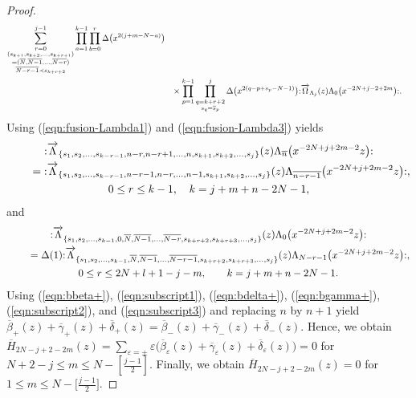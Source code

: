 \documentclass[pdftex]{sigma}
\numberwithin{equation}{section}
\begin{document}
\begin{proof}
\begin{align}
\sum\limits_{\substack{r=0\\(s_{k+1},s_{k+2},\dots, s_{k+r+1})\\
=(\overline{N}, \overline{N-1},\dots, \overline{N-r})
\\ \overline{N-r-1}\prec s_{k+r+2}}}^{j-1}
\prod_{a=1}^{k-1}\prod_{b=0}^r \Delta\big(x^{2(j+m-N-a)}\big)\notag
\\
&\phantom{+}\times\prod_{p=1}^{k-1}\prod\limits_{\substack{q=k+r+2\\s_q=\overline{s}_p}}^j
\Delta\big(x^{2(q-p+s_p-N-1)}\big){:}
\overrightarrow{\Omega}_{\Lambda_j}(z)\Lambda_0\big(x^{-2N+j-2+2m}\big){:}.
\label{eqn:bgamma+}
\end{align}
Using (\ref{eqn:fusion-Lambda1}) and (\ref{eqn:fusion-Lambda3}) yields
\begin{gather}
{:}\overrightarrow{\Lambda}_{\{
s_1,s_2, \dots, s_{k-r-1}, n-r, n-r+1,\dots, n, s_{k+1}, s_{k+2}, \dots, s_{j}
\}}(z) \Lambda_{\overline{n}}\big(x^{-2N+j+2m-2}z\big){:}\notag
\\ \qquad
{}={:}\overrightarrow{\Lambda}_{\{
s_1,s_2, \dots, s_{k-r-1}, n-r-1, n-r,\dots, n-1, s_{k+1}, s_{k+2}, \dots, s_{j}
\}}(z) \Lambda_{\overline{n-r-1}}\big(x^{-2N+j+2m-2}z\big){:},\notag
\\
0\leq r \leq k-1,\quad k=j+m+n-2N-1,
\label{eqn:subscript2}
\end{gather}
and
\begin{gather}
{:}\overrightarrow{\Lambda}_{\{
s_1,s_2, \dots, s_{k-1}, 0, \overline{N}, \overline{N-1}, \dots,
\overline{N-r}, s_{k+r+2}, s_{k+r+3}, \dots, s_{j}
\}}(z) \Lambda_{0}\big(x^{-2N+j+2m-2}z\big){:}\notag
\\ \qquad
{}=\Delta(1)
{:}\overrightarrow{\Lambda}_{\{
s_1,s_2, \dots, s_{k-1}, \overline{N}, \overline{N-1}, \dots,
\overline{N-r-1}, s_{k+r+2}, s_{k+r+3}, \dots, s_{j}\}}(z)
\Lambda_{N-r-1}\big(x^{-2N+j+2m-2}z\big){:},\notag
\\
0\leq r \leq 2N+l+1-j-m,\qquad k=j+m+n-2N-1.
\label{eqn:subscript3}
\end{gather}
Using (\ref{eqn:bbeta+}), (\ref{eqn:subscript1}), (\ref{eqn:bdelta+}),
(\ref{eqn:bgamma+}), (\ref{eqn:subscript2}), and (\ref{eqn:subscript3})
and replacing $n$ by $n+1$
yield $\overline{\beta}_+(z)+\overline{\gamma}_+(z)+\overline{\delta}_+(z)
=\overline{\beta}_-(z)+\overline{\gamma}_-(z)+\overline{\delta}_-(z)$.
Hence, we obtain
$\overline{H}_{2N-j+2-2m}(z)=\sum_{\varepsilon=\pm}\varepsilon
\big(\overline{\beta}_\varepsilon(z)+\overline{\gamma}_\varepsilon(z)
+\overline{\delta}_\varepsilon(z)\big)=0$
for $N+2-j \leq m \leq N-[\frac{j-1}{2}]$.
Finally, we obtain
$\overline{H}_{2N-j+2-2m}(z)=0$ for $1 \leq m \leq N-\big[\frac{j-1}{2}\big]$.


\end{proof}
\end{document}
